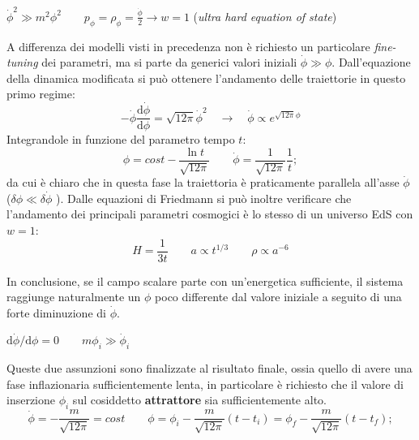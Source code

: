 \vspace{1em}
\begin{example} $\dot{\phi}^2 \gg m^2 \phi^2 \qquad p_\phi = \rho_\phi = \frac{\dot{\phi}}{2} \rightarrow w=1$ (\textit{ultra hard equation of state})
\end{example}
\noindent A differenza dei modelli visti in precedenza non è richiesto un particolare \textit{fine-tuning} dei parametri, ma si parte da generici valori iniziali $\dot{\phi} \gg \phi$. Dall'equazione della dinamica modificata si può ottenere l'andamento delle traiettorie in questo primo regime:
\begin{equation}
    -\dot{\phi} \frac{\mathrm{d} \dot{\phi}}{\mathrm{d} \phi} = \sqrt{12 \pi} \dot{\phi}^2 \quad \rightarrow \quad \dot{\phi} \propto e^{\sqrt{12 \pi} \phi}
\end{equation}
Integrandole in funzione del parametro tempo $t$:
\begin{equation}
    \phi= cost - \frac{\ln t}{\sqrt{12 \pi}} \qquad \dot{\phi} = \frac{1}{\sqrt{12 \pi}}\frac{1}{t};
\end{equation}
da cui è chiaro che in questa fase la traiettoria è praticamente parallela all'asse $\dot{\phi}$ ($\delta \phi \ll \delta\dot{\phi}$ ). Dalle equazioni di Friedmann si può inoltre verificare che l'andamento dei principali parametri cosmogici è lo stesso di un universo EdS con $w=1$:
\begin{equation}
    H = \frac{1}{3t} \qquad a \propto t^{1/3} \qquad \rho \propto a^{-6}
\end{equation}

In conclusione, se il campo scalare parte con un'energetica sufficiente, il sistema raggiunge naturalmente un $\phi$ poco differente dal valore iniziale a seguito di una forte diminuzione di $\dot{\phi}$.

\vspace{1em}
\begin{example}[Inflazione] 
    $\mathrm{d} \dot{\phi} / \mathrm{d} \phi=0 \qquad m\phi_i \gg \dot{\phi}_i$
\end{example}

Queste due assunzioni sono finalizzate al risultato finale, ossia quello di avere una fase inflazionaria sufficientemente lenta, in particolare è richiesto che il valore di inserzione $\phi_i$ sul cosiddetto \textbf{attrattore} sia sufficientemente alto. 
\begin{equation}
    \dot{\phi} =  -\frac{m}{\sqrt{12 \pi}} = cost \qquad \phi= \phi_i - \frac{m}{\sqrt{12 \pi}} (t-t_i) = \phi_f - \frac{m}{\sqrt{12 \pi}} (t-t_f); \label{eq:phidotphiinfl}
\end{equation}


